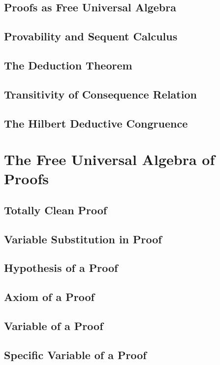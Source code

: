 \documentclass{report}
\begin{document}
    \subsection{Proofs as Free Universal Algebra}
    \subsection{Provability and Sequent Calculus}
    \subsection{The Deduction Theorem}
    \subsection{Transitivity of Consequence Relation}%
    \subsection{The Hilbert Deductive Congruence}%
\section{The Free Universal Algebra of Proofs}
    \subsection{Totally Clean Proof}
    \subsection{Variable Substitution in Proof}
    \subsection{Hypothesis of a Proof}
    \subsection{Axiom of a Proof}
    \subsection{Variable of a Proof}
    \subsection{Specific Variable of a Proof}
\end{document}
